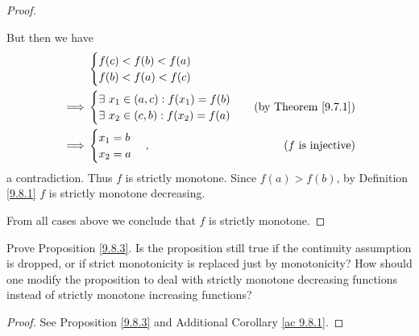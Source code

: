 \begin{proof}
\begin{itemize}
              But then we have
              \begin{align*}
                           & \begin{cases}
                                 f(c) < f(b) < f(a) \\
                                 f(b) < f(a) < f(c)
                             \end{cases}                                                      \\
                  \implies & \begin{cases}
                                 \exists\ x_1 \in (a, c) : f(x_1) = f(b) \\
                                 \exists\ x_2 \in (c, b) : f(x_2) = f(a) \\
                             \end{cases} & \text{(by Theorem \ref{9.7.1})}                           \\
                  \implies & \begin{cases}
                                 x_1 = b \\
                                 x_2 = a
                             \end{cases},                              & \text{(\(f\) is injective)}
              \end{align*}
              a contradiction.
              Thus \(f\) is strictly monotone.
              Since \(f(a) > f(b)\), by Definition \ref{9.8.1} \(f\) is strictly monotone decreasing.
    \end{itemize}
    From all cases above we conclude that \(f\) is strictly monotone.
\end{proof}

\begin{exercise}\label{ex 9.8.4}
    Prove Proposition \ref{9.8.3}.
    Is the proposition still true if the continuity assumption is dropped, or if strict monotonicity is replaced just by monotonicity?
    How should one modify the proposition to deal with strictly monotone decreasing functions instead of strictly monotone increasing functions?
\end{exercise}

\begin{proof}
    See Proposition \ref{9.8.3} and Additional Corollary \ref{ac 9.8.1}.
\end{proof}

